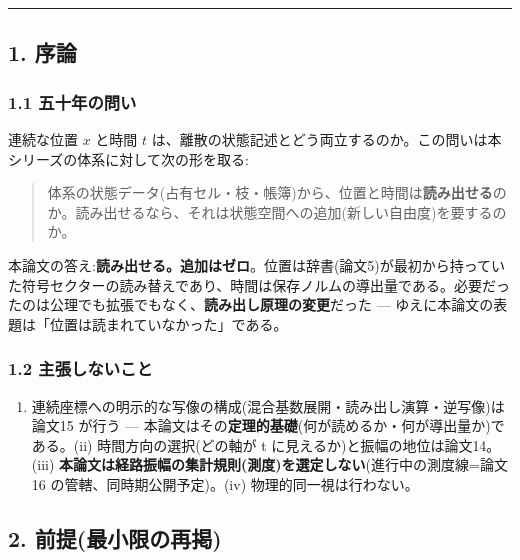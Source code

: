 \documentclass[
]{ltjsarticle}
\providecommand{\tightlist}{%
  \setlength{\itemsep}{0pt}\setlength{\parskip}{0pt}}
\begin{document}
\begin{center}\rule{0.5\linewidth}{0.5pt}\end{center}

\subsection{1. 序論}\label{ux5e8fux8ad6}

\subsubsection{1.1
五十年の問い}\label{ux4e94ux5341ux5e74ux306eux554fux3044}

連続な位置 \(x\) と時間 \(t\)
は、離散の状態記述とどう両立するのか。この問いは本シリーズの体系に対して次の形を取る:

\begin{quote}
体系の状態データ(占有セル・枝・帳簿)から、位置と時間は\textbf{読み出せる}のか。読み出せるなら、それは状態空間への追加(新しい自由度)を要するのか。
\end{quote}

本論文の答え:\textbf{読み出せる。追加はゼロ}。位置は辞書(論文5)が最初から持っていた符号セクターの読み替えであり、時間は保存ノルムの導出量である。必要だったのは公理でも拡張でもなく、\textbf{読み出し原理の変更}だった
--- ゆえに本論文の表題は「位置は読まれていなかった」である。

\subsubsection{1.2
主張しないこと}\label{ux4e3bux5f35ux3057ux306aux3044ux3053ux3068}

\begin{enumerate}
\def\labelenumi{(\roman{enumi})}
\tightlist
\item
  連続座標への明示的な写像の構成(混合基数展開・読み出し演算・逆写像)は論文15
  が行う ---
  本論文はその\textbf{定理的基礎}(何が読めるか・何が導出量か)である。(ii)
  時間方向の選択(どの軸が t に見えるか)と振幅の地位は論文14。(iii)
  \textbf{本論文は経路振幅の集計規則(測度)を選定しない}(進行中の測度線=論文16
  の管轄、同時期公開予定)。(iv) 物理的同一視は行わない。
\end{enumerate}

\subsection{2.
前提(最小限の再掲)}\label{ux524dux63d0ux6700ux5c0fux9650ux306eux518dux63b2}
\end{document}
